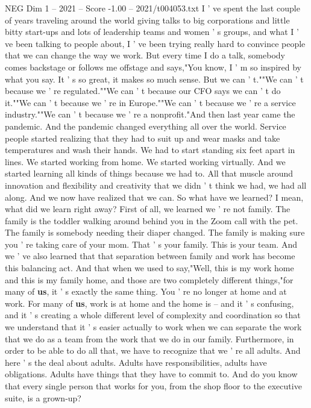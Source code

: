 \begin{textsample}{NEG Dim 1 – 2021 – Score -1.00 – 2021/t004053.txt}  \label{ex:f1_neg_020}
I ' ve spent the last couple of years traveling around the world giving talks to big corporations and little bitty start-ups and lots of leadership teams and women ' s groups, and what I ' ve been talking to people about, I ' ve been trying really hard to convince people that we can change the way we work.
But every time I do a talk, somebody comes backstage or follows me offstage and says,"You know, I ' m so inspired by what you say.
It ' s so great, it makes so much sense.
But we can ' t.""We can ' t because we ' re regulated.""We can ' t because our CFO says we can ' t do it.""We can ' t because we ' re in Europe.""We can ' t because we ' re a service industry.""We can ' t because we ' re a nonprofit."And then last year came the pandemic.
And the pandemic changed everything all over the world.
Service people started realizing that they had to suit up and wear masks and take temperatures and wash their hands.
We had to start standing six feet apart in lines.
We started working from home.
We started working virtually.
And we started learning all kinds of things because we had to.
All that muscle around innovation and flexibility and creativity that we didn ' t think we had, we had all along.
And we now have realized that we can.
So what have we learned?
I mean, what did we learn right away?
First of all, we learned we ' re not family.
The family is the toddler walking around behind you in the Zoom call with the pet.
The family is somebody needing their diaper changed.
The family is making sure you ' re taking care of your mom.
That ' s your family.
This is your team.
And we ' ve also learned that that separation between family and work has become this balancing act.
And that when we used to say,"Well, this is my work home and this is my family home, and those are two completely different things,"for many of \textbf{us}, it ' s exactly the same thing.
You ' re no longer at home and at work.
For many of \textbf{us}, work is at home and the home is -- and it ' s confusing, and it ' s creating a whole different level of complexity and coordination so that we understand that it ' s easier actually to work when we can separate the work that we do as a team from the work that we do in our family.
Furthermore, in order to be able to do all that, we have to recognize that we ' re all adults.
And here ' s the deal about adults.
Adults have responsibilities, adults have obligations.
Adults have things that they have to commit to.
And do you know that every single person that works for you, from the shop floor to the executive suite, is a grown-up?

\end{textsample}
